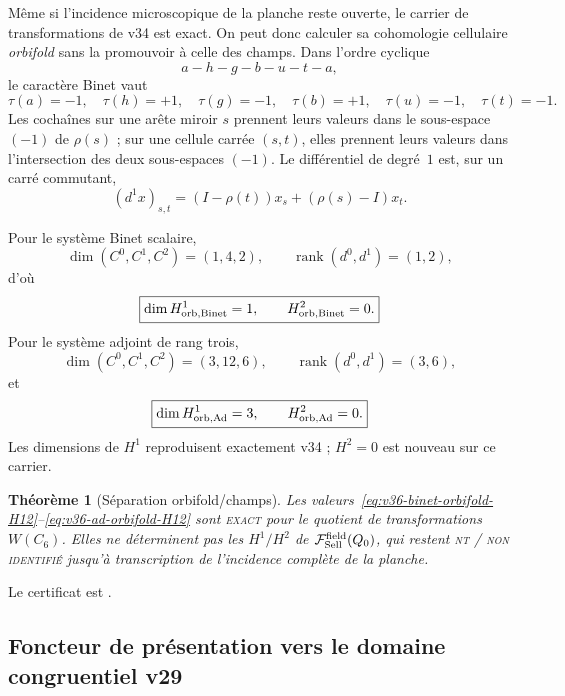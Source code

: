 \documentclass[11pt,a4paper]{article}
\newtheorem{theorem}{Théorème}[section]
\newcommand{\rank}{\operatorname{rank}}
\newcommand{\statusExact}{\textsc{exact}}
\newcommand{\statusNT}{\textsc{nt / non identifié}}
\begin{document}
Même si l'incidence microscopique de la planche reste ouverte, le carrier de transformations de v34 est exact. On peut donc calculer sa cohomologie cellulaire \emph{orbifold} sans la promouvoir à celle des champs. Dans l'ordre cyclique
\[
 a-h-g-b-u-t-a,
\]
le caractère Binet vaut
\[
\tau(a)=-1,\quad \tau(h)=+1,\quad \tau(g)=-1,\quad
\tau(b)=+1,\quad \tau(u)=-1,\quad \tau(t)=-1.
\]
Les cochaînes sur une arête miroir $s$ prennent leurs valeurs dans le sous-espace $(-1)$ de $\rho(s)$ ; sur une cellule carrée $(s,t)$, elles prennent leurs valeurs dans l'intersection des deux sous-espaces $(-1)$. Le différentiel de degré~$1$ est, sur un carré commutant,
\begin{equation}\label{eq:v36-davis-d1}
 (d^1x)_{s,t}=(I-\rho(t))x_s+(\rho(s)-I)x_t.
\end{equation}

Pour le système Binet scalaire,
\[
\dim(C^0,C^1,C^2)=(1,4,2),
\qquad
\rank(d^0,d^1)=(1,2),
\]
d'où
\begin{equation}\label{eq:v36-binet-orbifold-H12}
\boxed{\dim H^1_{\rm orb,Binet}=1,\qquad H^2_{\rm orb,Binet}=0.}
\end{equation}
Pour le système adjoint de rang trois,
\[
\dim(C^0,C^1,C^2)=(3,12,6),
\qquad
\rank(d^0,d^1)=(3,6),
\]
et
\begin{equation}\label{eq:v36-ad-orbifold-H12}
\boxed{\dim H^1_{\rm orb,Ad}=3,\qquad H^2_{\rm orb,Ad}=0.}
\end{equation}
Les dimensions de $H^1$ reproduisent exactement v34 ; $H^2=0$ est nouveau sur ce carrier.

\begin{theorem}[Séparation orbifold/champs]\label{thm:v36-orbifold-field-separation}
Les valeurs~\eqref{eq:v36-binet-orbifold-H12}--\eqref{eq:v36-ad-orbifold-H12} sont \statusExact{} pour le quotient de transformations $W(C_6)$. Elles ne déterminent pas les $H^1/H^2$ de $\mathcal F_{\rm Sell}^{\rm field}(Q_0)$, qui restent \statusNT{} jusqu'à transcription de l'incidence complète de la planche.
\end{theorem}

Le certificat est .

\subsection{Foncteur de présentation vers le domaine congruentiel v29}
\end{document}
